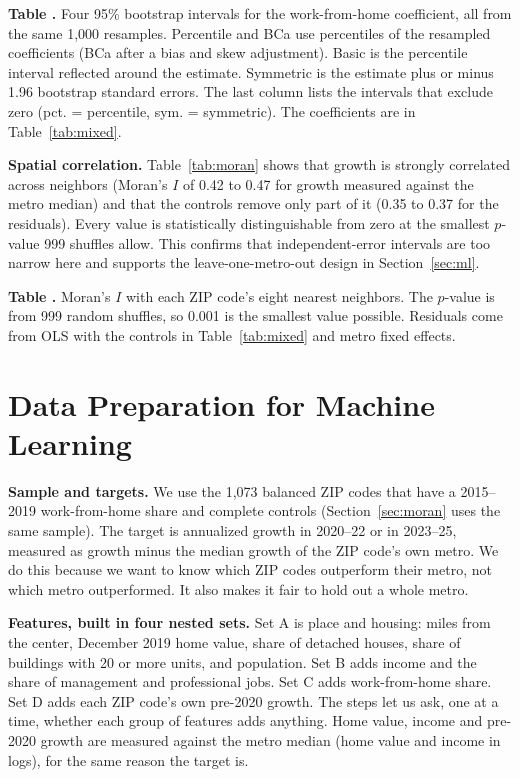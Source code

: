 \documentclass[11pt]{article}
\newcounter{tabnum}
\newcommand{\tab}[3]{%
  \begin{table}[!tbp]\centering
  \refstepcounter{tabnum}\label{#2}%
  {\small\raggedright\textbf{Table \thetabnum.} #3\par}\vspace{3pt}
  
  \end{table}}
\begin{document}
\tab{t_m_boot}{tab:boot}{Four 95\% bootstrap intervals for the work-from-home coefficient, all from the same 1,000 resamples.
Percentile and BCa use percentiles of the resampled coefficients (BCa after a bias and skew adjustment). Basic is the percentile
interval reflected around the estimate. Symmetric is the estimate plus or minus 1.96 bootstrap standard errors. The last column lists the
intervals that exclude zero (pct. = percentile, sym. = symmetric). The coefficients are in Table~\ref{tab:mixed}.}

\textbf{Spatial correlation.} Table~\ref{tab:moran} shows that growth is strongly correlated across neighbors (Moran's $I$ of
0.42 to 0.47 for growth measured against the metro median) and that the controls remove only part of it (0.35 to 0.37 for the
residuals). Every value is statistically distinguishable from zero at the smallest $p$-value 999 shuffles allow. This confirms that
independent-error intervals are too narrow here and supports the leave-one-metro-out design in Section~\ref{sec:ml}.

\tab{t_m_moran}{tab:moran}{Moran's $I$ with each ZIP code's eight nearest neighbors. The $p$-value is from 999 random shuffles,
so 0.001 is the smallest value possible. Residuals come from OLS with the controls in Table~\ref{tab:mixed} and metro fixed effects.}

\section{Data Preparation for Machine Learning}
\label{sec:prep}

\textbf{Sample and targets.} We use the 1,073 balanced ZIP codes that have a 2015--2019 work-from-home share and complete controls
(Section~\ref{sec:moran} uses the same sample). The target is annualized growth in 2020--22 or in 2023--25, measured as growth
minus the median growth of the ZIP code's own metro. We do this because we want to know which ZIP codes outperform their metro, not
which metro outperformed. It also makes it fair to hold out a whole metro.

\textbf{Features, built in four nested sets.} Set A is place and housing: miles from the center, December 2019 home value, share of
detached houses, share of buildings with 20 or more units, and population. Set B adds income and the share of management and
professional jobs. Set C adds work-from-home share. Set D adds each ZIP code's own pre-2020 growth. The steps let us ask, one at a
time, whether each group of features adds anything. Home value, income and pre-2020 growth are measured against the metro median
(home value and income in logs), for the same reason the target is.
\end{document}
